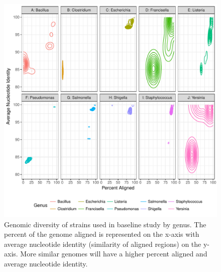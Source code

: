 \documentclass[fleqn,10pt,lineno]{wlpeerj}\usepackage[]{graphicx}\usepackage[]{color}
\makeatletter
\def\maxwidth{ %
  \ifdim\Gin@nat@width>\linewidth
    \linewidth
  \else
    \Gin@nat@width
  \fi
}
\newenvironment{knitrout}{}{} %
\makeatother
\begin{document}
\begin{knitrout}
\color{fgcolor}\begin{figure}
\includegraphics[width=\maxwidth]{figure/baseline_ani-1} \caption[Genomic diversity of strains used in baseline study by genus]{Genomic diversity of strains used in baseline study by genus. The percent of the genome aligned is represented on the x-axis with average nucleotide identity (similarity of aligned regions) on the y-axis. More similar genomes will have a higher percent aligned and average nucleotide identity.}\label{fig:baseline_ani}
\end{figure}


\end{knitrout}
\end{document}

